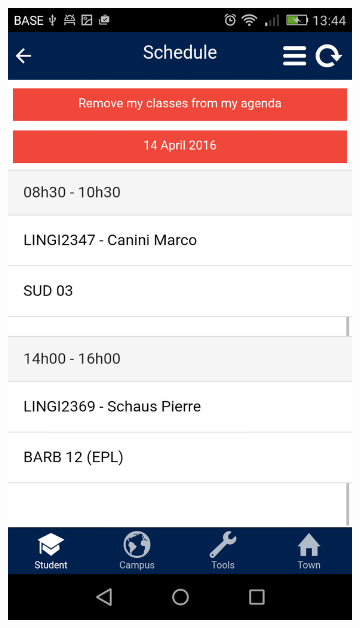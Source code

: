 \documentclass{eplmastersthesis}
\begin{document}
\begin{figure}
    \centering
\begin{subfigure}[b]{0.3\textwidth}
        \includegraphics[width=\textwidth]{Images/Application_screens/Screenshot_2016-06-06-13-44-12.png}
    \end{subfigure}
    ~ %
    \begin{subfigure}[b]{0.3\textwidth}

\end{subfigure}
\end{figure}
\end{document}
